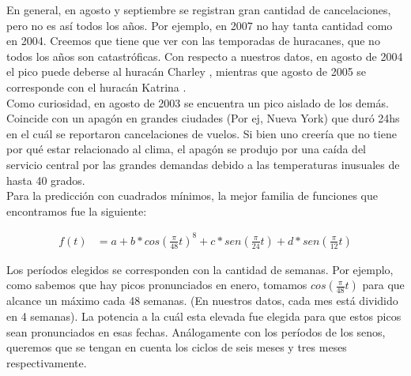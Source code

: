 En general, en agosto y septiembre se registran gran cantidad de cancelaciones, pero no es así todos los años. Por ejemplo, en 2007 no hay tanta cantidad como en 2004. Creemos que tiene que ver con las temporadas de huracanes, que no todos los años son catastróficas. Con respecto a nuestros datos, en agosto de 2004 el pico puede deberse al huracán Charley \cite{HuracanCharley}, mientras que agosto de 2005 se corresponde con el huracán Katrina \cite{HuracanKatrina}. \\

Como curiosidad, en agosto de 2003 se encuentra un pico aislado de los demás. Coincide con un apagón en grandes ciudades (Por ej, Nueva York) que duró 24hs en el cuál se reportaron cancelaciones de vuelos. Si bien uno creería que no tiene por qué estar relacionado al clima, el apagón se produjo por una caída del servicio central por las grandes demandas debido a las temperaturas inusuales de hasta 40 grados. \cite{ApagonNewYork} \\

Para la predicción con cuadrados mínimos, la mejor familia de funciones que encontramos fue la siguiente:

\begin{align}
f(t) &= a + b * cos(\frac{\pi}{48} t)^{8} + c * sen(\frac{\pi}{24} t) + d * sen(\frac{\pi}{12} t)
\end{align}

Los períodos elegidos se corresponden con la cantidad de semanas. Por ejemplo, como sabemos que hay picos pronunciados en enero, tomamos $cos(\frac{\pi}{48} t)$ para que alcance un máximo cada 48 semanas. (En nuestros datos, cada mes está dividido en 4 semanas). La potencia a la cuál esta elevada fue elegida para que estos picos sean pronunciados en esas fechas. Análogamente con los períodos de los senos, queremos que se tengan en cuenta los ciclos de seis meses y tres meses respectivamente. \\

